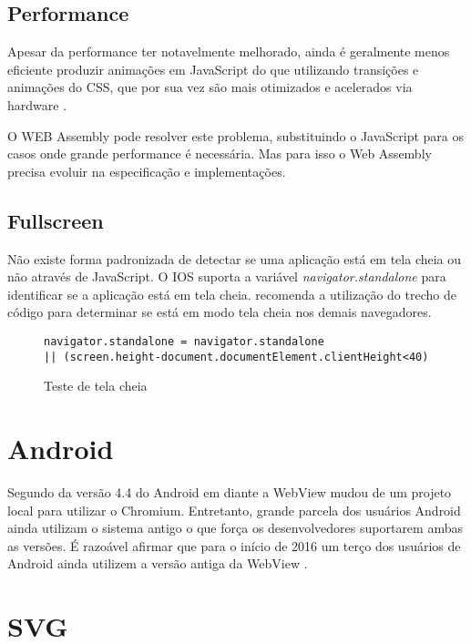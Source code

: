 \subsection{Performance}

Apesar da performance ter notavelmente melhorado, ainda é geralmente
menos eficiente produzir animações em JavaScript do que utilizando
transições e animações do CSS, que por sua vez são mais otimizados
e acelerados via hardware \autocite{html5mostwanted}.

O WEB Assembly pode resolver este problema, substituindo o JavaScript
para os casos onde grande performance é necessária. Mas para isso o
Web Assembly precisa evoluir na especificação e implementações.

\subsection{Fullscreen}

Não existe forma padronizada de detectar se uma aplicação está em
tela cheia ou não através de JavaScript. O IOS suporta a variável
\textit{navigator.standalone } para identificar se a aplicação está
em tela cheia. \cite{homescreenwebapps} recomenda a utilização do
trecho de código para determinar se está em modo tela cheia
nos demais navegadores.

\begin{figure}[H]
\centering
\begin{verbatim}
navigator.standalone = navigator.standalone 
|| (screen.height-document.documentElement.clientHeight<40)
\end{verbatim}
\caption{Teste de tela cheia}
\label{fig:fixJSTypes}
\end{figure}


\section{Android}

Segundo \cite{chromeWebView} da versão 4.4 do Android em diante a
WebView mudou de um projeto local para utilizar o Chromium. Entretanto,
grande parcela dos usuários Android ainda utilizam o sistema antigo o
que força os desenvolvedores suportarem ambas as versões. É razoável
afirmar que para o início de 2016 um terço dos usuários de Android
ainda utilizem a versão antiga da WebView \cite{chromeWebView}.

\section{SVG}

